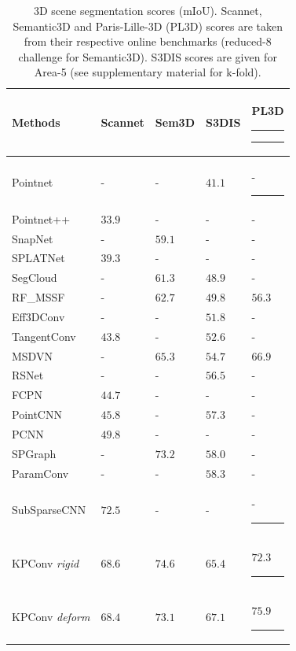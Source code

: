 \documentclass[10pt,twocolumn,letterpaper]{article}
\newcommand\Tstrut{\rule{-3pt}{2.6ex}}       %
\newcommand\Bstrut{\rule[-0.9ex]{-3pt}{0pt}} %
\newcommand{\TBstrut}{\rule{-3pt}{2.6ex} \rule[-0.9ex]{-2pt}{0pt}}  %
\begin{document}
\begin{table}[!t]
\setlength\tabcolsep{0.5pt}
\begin{center}
\begin{tabular}{ L{2.8cm} C{1.3cm}  C{1.3cm} C{1.3cm} C{1.3cm}}
\hline
Methods & Scannet & Sem3D & S3DIS & PL3D \TBstrut\\
\hline

Pointnet \cite{qi2017pointnet}	            & - & - & $41.1$ & - \Tstrut\\
Pointnet++ \cite{qi2017pointnet++}	        & $33.9$ & - & - & - \\
SnapNet \cite{boulch2017unstructured}	    & - & $59.1$ & - & - \\
SPLATNet \cite{su2018splatnet}	            & $39.3$ & - & - & - \\
SegCloud \cite{tchapmi2017segcloud}	        & - & $61.3$ & $48.9$ & -\\
RF\_MSSF \cite{thomas2018semantic}	        & - & $62.7$ & $49.8$ & $56.3$ \\
Eff3DConv \cite{zhang2018efficient}	        & - & - & $51.8$ & -\\
TangentConv \cite{tatarchenko2018tangent}	& $43.8$ & - & $52.6$ & -\\
MSDVN \cite{roynard2018classification}      & - & $65.3$ & $54.7$ & $66.9$	\\
RSNet \cite{huang2018recurrent}             & - & - & $56.5$ & -	\\
FCPN \cite{rethage2018fully}	            & $44.7$ & - & - & - \\
PointCNN \cite{li2018pointcnn}	            & $45.8$ & - & $57.3$ & - \\
PCNN \cite{atzmon2018point}	                & $49.8$ & - & - & -\\
SPGraph \cite{landrieu2018large}	        & - & $73.2$ & $58.0$ & -	\\
ParamConv \cite{wang2018deep}	            & - & - & $58.3$ & -  \\
SubSparseCNN \cite{graham20183d}	        & $\mathbf{72.5}$ & - & - & - \Bstrut\\
\hline
KPConv \textit{rigid} & $68.6$ & $\mathbf{74.6}$	& $65.4$ & $72.3$ \Tstrut\\
KPConv \textit{deform} & $68.4$ & $73.1$	& $\mathbf{67.1}$ & $\mathbf{75.9}$ \Bstrut\\
\hline
\end{tabular}
\end{center}
\caption{3D scene segmentation scores (mIoU). Scannet, Semantic3D and Paris-Lille-3D (PL3D) scores are taken from their respective online benchmarks (reduced-8 challenge for Semantic3D). S3DIS scores are given for Area-5 (see supplementary material for k-fold).}
\label{Table_Semantic3D}
\vspace{-3ex}
\end{table}
\end{document}

